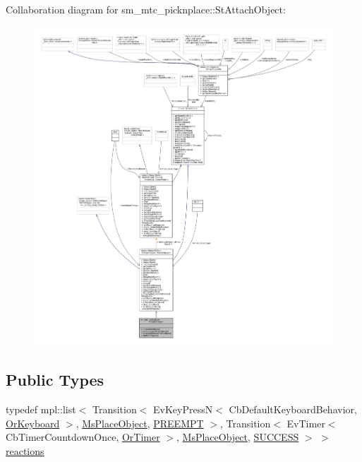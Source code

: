 Collaboration diagram for sm\+\_\+mtc\+\_\+picknplace\+:\+:St\+Attach\+Object\+:
\nopagebreak
\begin{figure}[H]
\begin{center}
\leavevmode
\includegraphics[width=350pt]{structsm__mtc__picknplace_1_1StAttachObject__coll__graph}
\end{center}
\end{figure}
\subsection*{Public Types}
\begin{DoxyCompactItemize}
\item 
typedef mpl\+::list$<$ Transition$<$ Ev\+Key\+PressN$<$ Cb\+Default\+Keyboard\+Behavior, \hyperlink{classsm__mtc__picknplace_1_1OrKeyboard}{Or\+Keyboard} $>$, \hyperlink{classsm__mtc__picknplace_1_1MsPlaceObject}{Ms\+Place\+Object}, \hyperlink{classPREEMPT}{P\+R\+E\+E\+M\+PT} $>$, Transition$<$ Ev\+Timer$<$ Cb\+Timer\+Countdown\+Once, \hyperlink{classsm__mtc__picknplace_1_1OrTimer}{Or\+Timer} $>$, \hyperlink{classsm__mtc__picknplace_1_1MsPlaceObject}{Ms\+Place\+Object}, \hyperlink{classSUCCESS}{S\+U\+C\+C\+E\+SS} $>$ $>$ \hyperlink{structsm__mtc__picknplace_1_1StAttachObject_a55a12e8b5e5d5cb138cd0fa3b621865c}{reactions}
\end{DoxyCompactItemize}
